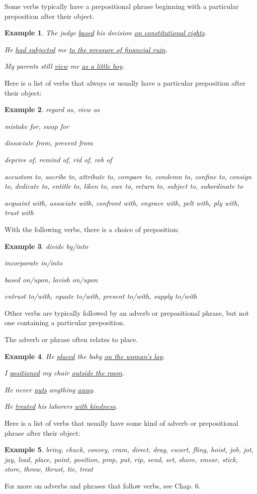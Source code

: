 \documentclass[oneside]{book}
\numberwithin{equation}{section}
\newtheorem{example}{Example}[section]
\begin{document}
%
Some verbs typically have a prepositional phrase beginning with a particular preposition after their object.
\begin{example}
    The judge \underline{based} his decision \underline{on constitutional rights}.
    
    He \underline{had subjected} me \underline{to the pressure of financial ruin}.
    
    My parents still \underline{view} me \underline{as a little boy}.
\end{example}
%
Here is a list of verbs that always or usually have a particular preposition after their object:
\begin{example}
    regard as, view as
    
    mistake for, swap for
    
    dissociate from, prevent from
    
    deprive of, remind of, rid of, rob of
    
    accustom to, ascribe to, attribute to, compare to, condemn to, confine to, consign to, dedicate to, entitle to, liken to, owe to, return to, subject to, subordinate to
    
    acquaint with, associate with, confront with, engrave with, pelt with, ply with, trust with
\end{example}
With the following verbs, there is a choice of preposition:
\begin{example}
    divide by/into
    
    incorporate in/into
    
    based on/upon, lavish on/upon
    
    entrust to/with, equate to/with, present to/with, supply to/with
\end{example}
%
\noindent{} Other verbs are typically followed by an adverb or prepositional phrase, but not one containing a particular preposition.

The adverb or phrase often relates to place.
\begin{example}
    He \underline{placed} the baby \underline{on the woman's lap}.
    
    I \underline{positioned} my chair \underline{outside the room}.
    
    He never \underline{puts} anything \underline{away}.
    
    He \underline{treated} his laborers \underline{with kindness}.
\end{example}
Here is a list of verbs that usually have some kind of adverb or prepositional phrase after their object:
\begin{example}
    bring, chuck, convey, cram, direct, drag, escort, fling, hoist, job, jot, jay, lead, place, point, position, prop, put, rip, send, set, shove, smear, stick, store, throw, thrust, tie, treat
\end{example}
For more on adverbs and phrases that follow verbs, see Chap. 6.
\end{document}
